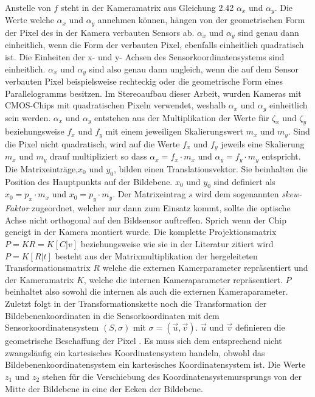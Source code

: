 		Anstelle von $f$ steht in der Kameramatrix aus Gleichung 2.42 $\alpha_x$ und $\alpha_y$. Die Werte welche $\alpha_x$ und $\alpha_y$ annehmen können, hängen von der geometrischen Form der Pixel des in der Kamera verbauten Sensors ab\cite{HZ,Photonik}.  $\alpha_x$ und $\alpha_y$ sind genau dann einheitlich, wenn die Form der verbauten Pixel, ebenfalls einheitlich quadratisch ist. Die Einheiten der x- und y- Achsen des Sensorkoordinatensystems sind einheitlich. $\alpha_x$ und $\alpha_y$ sind also genau dann ungleich, wenn die auf dem Sensor verbauten Pixel beispielsweise rechteckig oder die geometrische Form eines Parallelogramms besitzen\cite{HZ}. Im Stereoaufbau dieser Arbeit, wurden Kameras mit CMOS-Chips mit quadratischen Pixeln verwendet, weshalb $\alpha_x$ und $\alpha_y$ einheitlich sein werden. $\alpha_x$ und $\alpha_y$ entstehen aus der Multiplikation der Werte für $\zeta_x$ und $\zeta_y$ beziehungsweise  $f_x$ und $f_y$ mit einem jeweiligen Skalierungswert $m_x$ und $m_y$. Sind die Pixel nicht quadratisch, wird auf die Werte $f_x$ und $f_y$ jeweils eine Skalierung $m_x$ und $m_y$ drauf multipliziert so dass  $\alpha_x = f_x \cdot m_x$ und $\alpha_y = f_y \cdot m_y$ entspricht\cite{HZ}. Die Matrixeinträge,$x_{0}$ und $y_{0}$, bilden einen Translationsvektor. Sie beinhalten die Position des Hauptpunkts auf der Bildebene. $x_{0}$ und $y_{0}$ sind definiert als $x_{0} = p_x \cdot m_x$ und $x_{0} = p_y \cdot m_y$. Der Matrixeintrag $s$ wird dem sogenannten \textit{skew-Faktor} zugeordnet, welcher nur dann zum Einsatz kommt, sollte die optische Achse nicht orthogonal auf den Bildsensor auftreffen. Sprich wenn der Chip geneigt in der Kamera montiert wurde\cite{HZ}. Die komplette Projektionsmatrix $P=KR=K[C|v]$ beziehungsweise wie sie in der Literatur zitiert wird $P=K[R|t]$\cite{HZ} besteht aus der Matrixmultiplikation der hergeleiteten Transformationsmatrix $R$ welche die externen Kamerparameter repräsentiert und der Kameramatrix $K$, welche die internen Kameraparameter repräsentiert. $P$ beinhaltet also sowohl die internen als auch die externen Kameraparameter. Zuletzt folgt in der Transformationskette noch die Transformation der Bildebenenkoordinaten in die Sensorkoordinaten mit dem Sensorkoordinatensystem $(S,\sigma)$ mit $\sigma = (\vec{u},\vec{v})$. $\vec{u}$ und $\vec{v}$ definieren die geometrische Beschaffung der Pixel . Es muss sich dem entsprechend nicht zwangsläufig ein kartesisches Koordinatensystem handeln, obwohl das Bildebenenkoordinatensystem ein kartesisches Koordinatensystem ist. Die Werte $z_1$ und $z_2$ stehen für die Verschiebung des Koordinatensystemursprungs von der Mitte der Bildebene in eine der Ecken der Bildebene.
		
